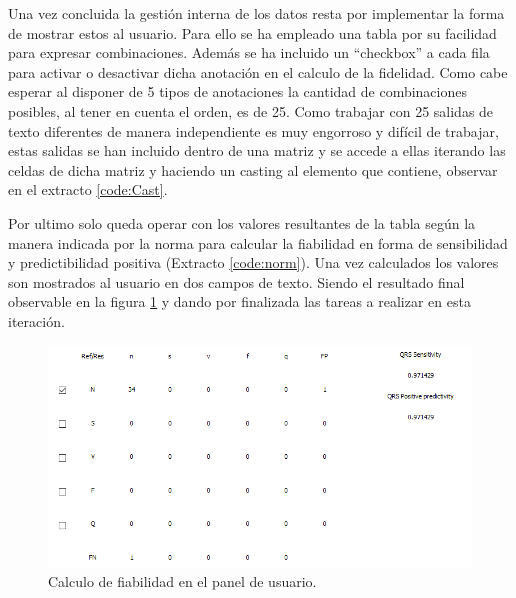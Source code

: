   
        \clearpage
        Una vez concluida la gestión interna de los datos resta por implementar la forma de mostrar estos al usuario. Para ello se ha empleado una tabla por su facilidad para expresar combinaciones. Además se ha incluido un ``checkbox'' a cada fila para activar o desactivar dicha anotación en el calculo de la fidelidad. Como cabe esperar al disponer de 5 tipos de anotaciones la cantidad de combinaciones posibles, al tener en cuenta el orden, es de 25. Como trabajar con 25 salidas de texto diferentes de manera independiente es muy engorroso y difícil de trabajar, estas salidas se han incluido dentro de una matriz y se accede a ellas iterando las celdas de dicha matriz y haciendo un casting al elemento que contiene, observar en el extracto \ref{code:Cast}. 
        
        
        Por ultimo solo queda operar con los valores resultantes de la tabla según la manera indicada por la norma para calcular la fiabilidad en forma de sensibilidad y predictibilidad positiva (Extracto \ref{code:norm}). Una vez calculados los valores son mostrados al usuario en dos campos de texto. Siendo el resultado final observable en la figura \ref{fig:fiability} y dando por finalizada las tareas a realizar en esta iteración.
        
        
        \begin{figure}[H]
                \centering
                        \includegraphics[width = \linewidth]{figuras/fiabilidad.PNG}
                \caption{Calculo de fiabilidad en el panel de usuario.}
                \label{fig:fiability}
        \end{figure}
        
